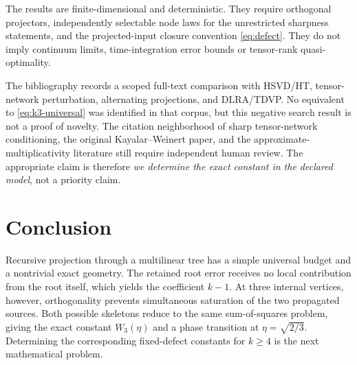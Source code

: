 \documentclass[11pt]{article}
\theoremstyle{definition}
\begin{document}
The results are finite-dimensional and deterministic.  They require orthogonal
projectors, independently selectable node laws for the unrestricted sharpness
statements, and the projected-input closure convention
\eqref{eq:defect}.  They do not imply continuum limits, time-integration error
bounds or tensor-rank quasi-optimality.

The bibliography records a scoped full-text comparison with HSVD/HT,
tensor-network perturbation, alternating projections, and DLRA/TDVP.  No
equivalent to \eqref{eq:k3-universal} was identified in that corpus, but this
negative search result is not a proof of novelty.  The citation neighborhood
of sharp tensor-network conditioning, the original Kayalar--Weinert paper, and
the approximate-multiplicativity literature still require independent human
review.  The appropriate claim is therefore \emph{we determine the exact
constant in the declared model}, not a priority claim.

\section{Conclusion}

Recursive projection through a multilinear tree has a simple universal budget
and a nontrivial exact geometry.  The retained root error receives no local
contribution from the root itself, which yields the coefficient $k-1$.  At
three internal vertices, however, orthogonality prevents simultaneous
saturation of the two propagated sources.  Both possible skeletons reduce to
the same sum-of-squares problem, giving the exact constant $W_3(\eta)$ and a
phase transition at $\eta=\sqrt{2/3}$.  Determining the corresponding
fixed-defect constants for $k\ge4$ is the next mathematical problem.



\end{document}
